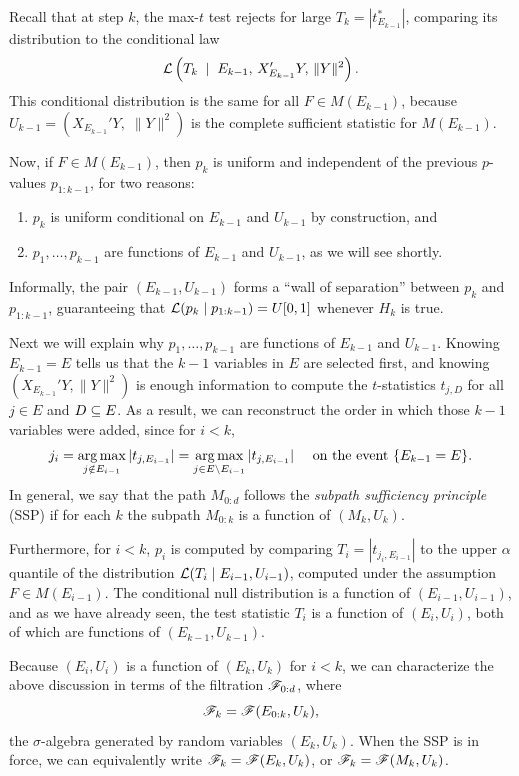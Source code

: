 \documentclass{article}
\begin{document}
Recall that at step $k$, the max-$t$ test rejects for large $T_k=|t_{E_{k-1}}^*|$, comparing its distribution to the conditional law
\begin{equation}\label{eq:maxTnull}
\mathcal{L}\left(T_k \; \mid \; E_{k-1}, \,X_{E_{k-1}}'Y, \,\|Y\|^2 \right).
\end{equation}
This conditional distribution is the same for all $F\in M(E_{k-1})$, because $U_{k-1}=(X_{E_{k-1}}'Y,\; \|Y\|^2)$ is the complete sufficient statistic for $M(E_{k-1})$.

Now, if $F\in M(E_{k-1})$, then $p_k$ is uniform and independent of the previous $p$-values $p_{1:k-1}$, for two reasons:
\begin{enumerate}
\item $p_k$ is uniform conditional on $E_{k-1}$ and $U_{k-1}$ by construction, and
\item $p_1, \ldots, p_{k-1}$ are functions of $E_{k-1}$ and $U_{k-1}$, as we will see shortly.
\end{enumerate}

Informally, the pair $(E_{k-1}, U_{k-1})$ forms a ``wall of separation'' between $p_k$ and $p_{1:k-1}$, guaranteeing that $\mathcal{L}(p_k \mid p_{1:k-1}) = U[0,1]$ whenever $H_k$ is true. 

Next we will explain why $p_1,\ldots,p_{k-1}$ are functions of $E_{k-1}$ and $U_{k-1}$. Knowing $E_{k-1}=E$ tells us that the $k-1$ variables in $E$ are selected first, and knowing $(X_{E_{k-1}}'Y,\|Y\|^2)$ is enough information to compute the $t$-statistics $t_{j,D}$ for all $j\in E$ and $D\subseteq E$. As a result, we can reconstruct the order in which those $k-1$ variables were added, since for $i<k$, 
\[
j_i = \operatorname*{arg\,max}_{j \notin E_{i-1}} |t_{j,E_{i-1}}| 
= \operatorname*{arg\,max}_{j \in E\setminus E_{i-1}} |t_{j,E_{i-1}}| \quad \text{ on the event } \{E_{k-1}=E\}.
\]
In general, we say that the path $M_{0:d}$ follows the {\em subpath sufficiency principle} (SSP) if for each $k$ the subpath $M_{0:k}$ is a function of $(M_k,U_k)$.

Furthermore, for $i<k$, $p_i$ is computed by comparing $T_i=|t_{j_i, E_{i-1}}|$ to the upper $\alpha$ quantile of the distribution $\mathcal{L}(T_i \mid E_{i-1}, U_{i-1})$, computed under the assumption $F\in M(E_{i-1})$. The conditional null distribution is a function of $(E_{i-1}, U_{i-1})$, and as we have already seen, the test statistic $T_i$ is a function of $(E_i, U_i)$, both of which are functions of $(E_{k-1},U_{k-1})$.

Because $(E_i,U_i)$ is a function of $(E_k,U_k)$ for $i<k$, we can characterize the above discussion in terms of the filtration $\mathscr{F}_{0:d}$, where
\[
\mathscr{F}_k = \mathscr{F}(E_{0:k}, U_k),
\]
the $\sigma$-algebra generated by random variables $(E_k, U_k)$. When the SSP is in force, we can equivalently write $\mathscr{F}_k=\mathscr{F}(E_k, U_k)$, or $\mathscr{F}_k=\mathscr{F}(M_k, U_k)$.
\end{document}
